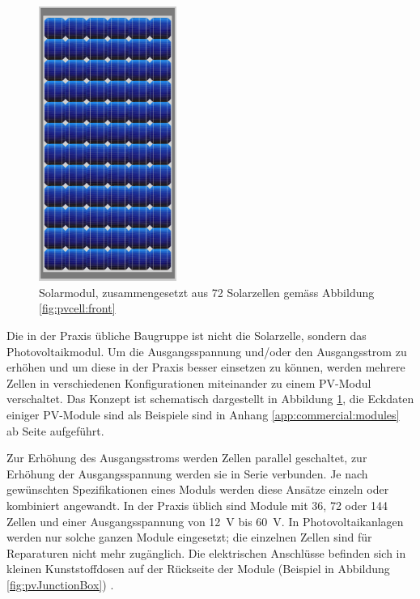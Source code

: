 \clearpage
\begin{figure}
    \centering
    \includegraphics[width=0.4\textwidth]{images/solar-facility/pvmodule.jpeg}
    \caption[Bild eines PV-Moduls]
    {%
        Solarmodul,  zusammengesetzt  aus  72 Solarzellen  gem\"ass  Abbildung
        \ref{fig:pvcell:front}%
    }
    \label{fig:pvmodule}
    \vspace*{-1em}
\end{figure}


Die  in der  Praxis  \"ubliche  Baugruppe ist  nicht  die Solarzelle,  sondern
das  Photovoltaikmodul.  Um  die Ausgangsspannung  und/oder den  Ausgangsstrom
zu  erh\"ohen  und um  diese  in  der  Praxis  besser einsetzen  zu  k\"onnen,
werden mehrere  Zellen in  verschiedenen Konfigurationen miteinander  zu einem
PV-Modul  verschaltet. Das Konzept  ist schematisch  dargestellt in  Abbildung
\ref{fig:pvmodule}, die Eckdaten einiger PV-Module  sind als Beispiele sind in
Anhang \ref{app:commercial:modules}  ab Seite \pageref{app:commercial:modules}
aufgef\"uhrt.

Zur  Erh\"ohung  des Ausgangsstroms  werden  Zellen  parallel geschaltet,  zur
Erh\"ohung  der  Ausgangsspannung werden  sie  in  Serie verbunden.   Je  nach
gew\"unschten Spezifikationen eines Moduls werden diese Ans\"atze einzeln oder
kombiniert angewandt.  In der Praxis \"ublich  sind Module mit 36, 72 oder 144
Zellen und  einer Ausgangsspannung  von \SI{12}{\volt}  bis \SI{60}{\volt}. In
Photovoltaikanlagen werden nur solche  ganzen Module eingesetzt; die einzelnen
Zellen  sind  f\"ur  Reparaturen  nicht  mehr  zug\"anglich. Die  elektrischen
Anschl\"usse befinden sich in kleinen  Kunststoffdosen auf der R\"uckseite der
Module (Beispiel in Abbildung \ref{fig:pvJunctionBox}) \cite{ref:pv:baunetz}.


